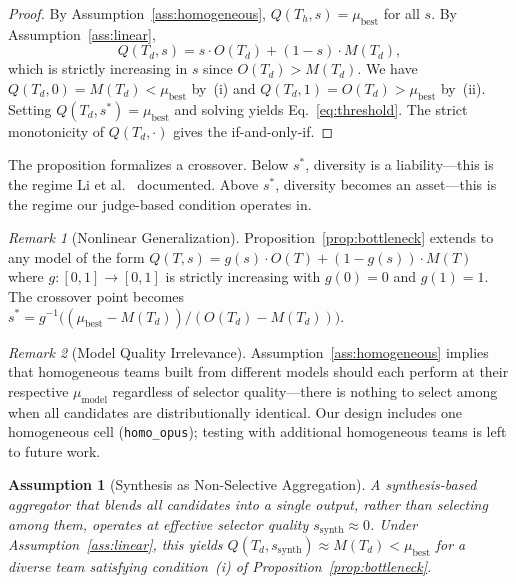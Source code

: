 \documentclass[10pt,twocolumn]{article}
\newtheorem{assumption}{Assumption}
\theoremstyle{remark}
\newtheorem{remark}{Remark}
\begin{document}
\begin{proof}
By Assumption~\ref{ass:homogeneous}, $Q(T_h, s) = \mu_{\mathrm{best}}$ for all $s$. By Assumption~\ref{ass:linear},
\[
  Q(T_d, s) = s \cdot O(T_d) + (1-s) \cdot M(T_d),
\]
which is strictly increasing in $s$ since $O(T_d) > M(T_d)$. We have $Q(T_d, 0) = M(T_d) < \mu_{\mathrm{best}}$ by~(i) and $Q(T_d, 1) = O(T_d) > \mu_{\mathrm{best}}$ by~(ii). Setting $Q(T_d, s^*) = \mu_{\mathrm{best}}$ and solving yields Eq.~\eqref{eq:threshold}. The strict monotonicity of $Q(T_d, \cdot)$ gives the if-and-only-if.
\end{proof}

The proposition formalizes a crossover. Below $s^*$, diversity is a liability---this is the regime Li et al.~\cite{li2025self} documented. Above $s^*$, diversity becomes an asset---this is the regime our judge-based condition operates in.

\begin{remark}[Nonlinear Generalization]
Proposition~\ref{prop:bottleneck} extends to any model of the form $Q(T, s) = g(s) \cdot O(T) + (1 - g(s)) \cdot M(T)$ where $g\colon [0,1] \to [0,1]$ is strictly increasing with $g(0) = 0$ and $g(1) = 1$. The crossover point becomes $s^* = g^{-1}\!\bigl((\mu_{\mathrm{best}} - M(T_d))/(O(T_d) - M(T_d))\bigr)$.
\end{remark}

\begin{remark}[Model Quality Irrelevance]
\label{rem:irrelevance}
Assumption~\ref{ass:homogeneous} implies that homogeneous teams built from different models should each perform at their respective $\mu_{\mathrm{model}}$ regardless of selector quality---there is nothing to select among when all candidates are distributionally identical. Our design includes one homogeneous cell (\texttt{homo\_opus}); testing with additional homogeneous teams is left to future work.
\end{remark}

\begin{assumption}[Synthesis as Non-Selective Aggregation]
\label{ass:synthesis}
A synthesis-based aggregator that blends all candidates into a single output, rather than selecting among them, operates at effective selector quality $s_{\mathrm{synth}} \approx 0$. Under Assumption~\ref{ass:linear}, this yields $Q(T_d, s_{\mathrm{synth}}) \approx M(T_d) < \mu_{\mathrm{best}}$ for a diverse team satisfying condition~(i) of Proposition~\ref{prop:bottleneck}.
\end{assumption}
\end{document}
